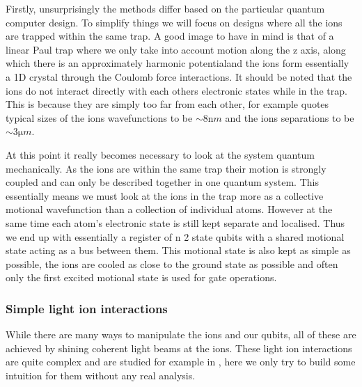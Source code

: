Firstly, unsurprisingly the methods differ based on the particular quantum computer design.
To simplify things we will focus on designs where all the ions are trapped within the same trap.
A good image to have in mind is that of a linear Paul trap where we only take into account motion along the z axis, along which there is an approximately harmonic potential\footnotemark and the ions form essentially a 1D crystal through the Coulomb force interactions.
It should be noted that the ions do not interact directly with each others electronic states while in the trap.
This is because they are simply too far from each other, for example \cite{schaferFastGatesMixedSpecies2020} quotes typical sizes of the ions wavefunctions to be $\sim 8 \si{\nano m}$ and the ions separations to be $\sim 3 \si{\micro m}$.


At this point it really becomes necessary to look at the system quantum mechanically.
As the ions are within the same trap their motion is strongly coupled and can only be described together in one quantum system.
This essentially means we must look at the ions in the trap more as a collective motional wavefunction than a collection of individual atoms.
However at the same time each atom's electronic state is still kept separate and localised.
Thus we end up with essentially a register of n 2 state qubits with a shared motional state acting as a bus between them.
This motional state is also kept as simple as possible, the ions are cooled as close to the ground state as possible and often only the first excited motional state is used for gate operations.

\subsubsection{Simple light ion interactions}
While there are many ways to manipulate the ions and our qubits, all of these are achieved by shining coherent light beams at the ions.
These light ion interactions are quite complex and are studied for example in \cite{loudonQuantumTheoryLight2000}, here we only try to build some intuition for them without any real analysis.

